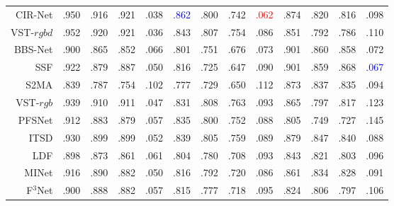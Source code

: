 \begin{table}[p]
{\begin{tabular}{rcccccccccccc}
			CIR-Net \upcite{cong2022cir}
			& .950 & .916 & .921 & .038 
			& \textcolor{blue}{.862} & .800 & .742 & \textcolor{red}{.062}
			& .874 & .820 & .816 & .098 \\ 
			
			VST-$rgbd$  \upcite{liu2021visual} 
			& .952 & .920 & .921 & .036 
			& .843 & .807 & .754 & .086 
			& .851 & .792 & .786 & .110 
			\\
			
			
			BBS-Net     \upcite{fan2020bbs} 
			& .900 & .865 & .852 & .066 
			& .801 & .751 & .676 & .073 
			& .901 & .860 & .858 & .072 \\ 
			
			SSF     \upcite{zhang2020select} 
			& .922 & .879 & .887 & .050 
			& .816 & .725 & .647 & .090 
			& .901 & .859 & .868 & \textcolor{blue}{.067} \\ 
			
			S2MA    \upcite{liu2020learning} 
			& .839 & .787 & .754 & 	.102 
			& .777 & .729 & .650 & .112 
			& .873 & .837 &	.835 & .094 \\
			
			
			\midrule %
			
			VST-$rgb$ \upcite{liu2021visual} 
			& .939 & .910 & .911 & .047
			& .831 & .808 & .763 & .093 
			& .865 & .797 & .817 & .123 
			\\ 
			
			PFSNet \upcite{ma2021pyramidal}
			& .912 & .883 & .879 & .057 
			& .835 & .800 & .752 & .088 
			& .805 & .749 & .727 & .145 
			\\ 
			
			
			ITSD \upcite{zhou2020interactive} 
			& .930 & .899 & .899 & .052 
			& .839 & .805 & .759 & .089 
			& .879 & .847 & .840 & .088 
			\\ 
			
			
			
			LDF \upcite{wei2020label} 
			& .898 & .873 & .861 & .061 
			& .804 & .780 & .708 & .093 
			& .843 & .821 & .803 & .096 
			\\ 
			
			
			MINet \upcite{pang2020multi} 
			& .916 & .890 & .882 & .050 
			& .816 & .792 & .720 & .086 
			& .861 & .834 & .828 & .091 
			\\ 
			
			F$^{3}$Net  \upcite{wei2020f3net}
			& .900 & .888 & .882 & .057 
			& .815 & .777 & .718 & .095 
			& .824 & .806 & .797 & .106 
			\\ 
			

\end{tabular}}
\end{table}
